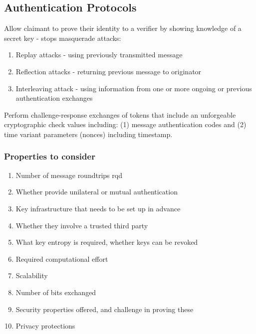 \documentclass{article}
\begin{document}
\subsection{Authentication Protocols}
Allow claimant to prove their identity to a verifier by showing knowledge of a secret key - stops masquerade attacks:
\begin{enumerate}
	\item Replay attacks - using previously transmitted message
	\item Reflection attacks - returning previous message to originator
	\item Interleaving attack - using information from one or more ongoing or previous authentication exchanges
\end{enumerate}

Perform challenge-response exchanges of tokens that include an unforgeable cryptographic check values including: (1) message authentication codes and (2) time variant parameters (nonces) including timestamp.

\subsubsection{Properties to consider}
\begin{enumerate}
	\item Number of message roundtrips rqd
	\item Whether provide unilateral or mutual authentication
	\item Key infrastructure that needs to be set up in advance
	\item Whether they involve a trusted third party
	\item What key entropy is required, whether keys can be revoked
	\item Required computational effort
	\item Scalability
	\item Number of bits exchanged
	\item Security properties offered, and challenge in proving these
	\item Privacy protections
\end{enumerate}
\end{document}
